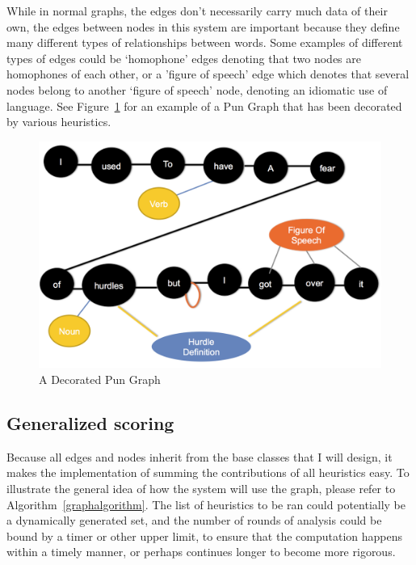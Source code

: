 While in normal graphs, the edges don't necessarily carry much data of their own, the edges between nodes in this system are important because they define many different types of relationships between words. Some examples of different types of edges could be `homophone' edges denoting that two nodes are homophones of each other, or a 'figure of speech' edge which denotes that several nodes belong to another `figure of speech' node, denoting an idiomatic use of language. See Figure~\ref{pungraph} for an example of a Pun Graph that has been decorated by various heuristics.

\begin{center}
\begin{figure}[h]
  \includegraphics[keepaspectratio=true, scale=.35]{pun-graph-example.png}
  \caption{A Decorated Pun Graph}
   \label{pungraph}
\end{figure}
\end{center}

\subsection{Generalized scoring}
Because all edges and nodes inherit from the base classes that I will design, it makes the implementation of summing the contributions of all heuristics easy. To illustrate the general idea of how the system will use the graph, please refer to Algorithm~\ref{graphalgorithm}. The list of heuristics to be ran could potentially be a dynamically generated set, and the number of rounds of analysis could be bound by a timer or other upper limit, to ensure that the computation happens within a timely manner, or perhaps continues longer to become more rigorous.

